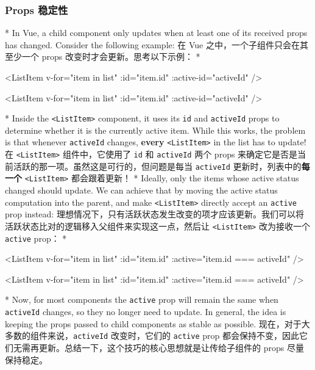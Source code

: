 \begin{paracol}{2}
\subsubsection{Props 稳定性}
\switchcolumn[0]*%
In Vue, a child component only updates when at least one of its received
props has changed. Consider the following example:
\switchcolumn
在 Vue 之中，一个子组件只会在其至少一个 props
改变时才会更新。思考以下示例：
\switchcolumn[0]*%
\begin{codeHtml}
<ListItem
  v-for="item in list"
  :id="item.id"
  :active-id="activeId" />
\end{codeHtml}
\switchcolumn
\begin{codeHtml}
<ListItem
  v-for="item in list"
  :id="item.id"
  :active-id="activeId" />
\end{codeHtml}
\switchcolumn[0]*%
Inside the \texttt{\textless{}ListItem\textgreater{}} component, it uses
its \texttt{id} and \texttt{activeId} props to determine whether it is
the currently active item. While this works, the problem is that
whenever \texttt{activeId} changes, \textbf{every}
\texttt{\textless{}ListItem\textgreater{}} in the list has to update!
\switchcolumn
在 \texttt{\textless{}ListItem\textgreater{}} 组件中，它使用了
\texttt{id} 和 \texttt{activeId} 两个 props
来确定它是否是当前活跃的那一项。虽然这是可行的，但问题是每当
\texttt{activeId} 更新时，列表中的\textbf{每一个}
\texttt{\textless{}ListItem\textgreater{}} 都会跟着更新！
\switchcolumn[0]*%
Ideally, only the items whose active status changed should update. We
can achieve that by moving the active status computation into the
parent, and make \texttt{\textless{}ListItem\textgreater{}} directly
accept an \texttt{active} prop instead:
\switchcolumn
理想情况下，只有活跃状态发生改变的项才应该更新。我们可以将活跃状态比对的逻辑移入父组件来实现这一点，然后让
\texttt{\textless{}ListItem\textgreater{}} 改为接收一个 \texttt{active}
prop：
\switchcolumn[0]*%
\begin{codeHtml}
<ListItem
  v-for="item in list"
  :id="item.id"
  :active="item.id === activeId" />
\end{codeHtml}
\switchcolumn
\begin{codeHtml}
<ListItem
  v-for="item in list"
  :id="item.id"
  :active="item.id === activeId" />
\end{codeHtml}
\switchcolumn[0]*%
Now, for most components the \texttt{active} prop will remain the same
when \texttt{activeId} changes, so they no longer need to update. In
general, the idea is keeping the props passed to child components as
stable as possible.
\switchcolumn
现在，对于大多数的组件来说，\texttt{activeId} 改变时，它们的
\texttt{active} prop
都会保持不变，因此它们无需再更新。总结一下，这个技巧的核心思想就是让传给子组件的
props 尽量保持稳定。
\end{paracol}

